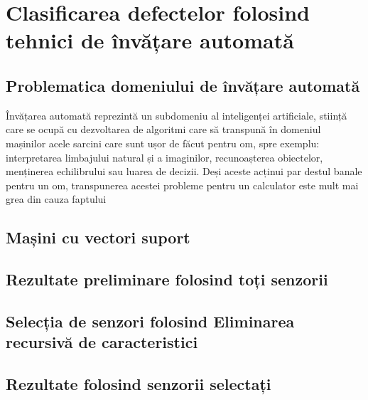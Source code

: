 \chapter{Clasificarea defectelor folosind tehnici de învățare automată}
\label{chap:ml_classification}


\section{Problematica domeniului de învățare automată}
Învățarea automată reprezintă un subdomeniu al inteligenței artificiale, stiință care se ocupă cu dezvoltarea de algoritmi care să transpună în domeniul mașinilor acele sarcini care sunt ușor de făcut pentru om, spre exemplu: interpretarea limbajului natural și a imaginilor, recunoașterea obiectelor, menținerea echilibrului sau luarea de decizii. Deși aceste acținui par destul banale pentru un om, transpunerea acestei probleme pentru un calculator este mult mai grea din cauza faptului 

\section{Mașini cu vectori suport}

\section{Rezultate preliminare folosind toți senzorii}

\section{Selecția de senzori folosind Eliminarea recursivă de caracteristici}

\section{Rezultate folosind senzorii selectați}